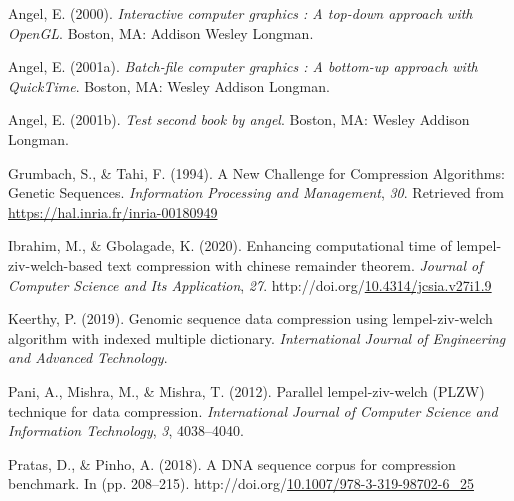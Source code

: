 \documentclass[12pt,twoside]{reedthesis}
\newlength{\cslhangindent}
\newenvironment{CSLReferences}[2] %
 {%
  \setlength{\parindent}{0pt}
  \ifodd #1 \everypar{\setlength{\hangindent}{\cslhangindent}}\ignorespaces\fi
  \ifnum #2 > 0
  \setlength{\parskip}{#2\baselineskip}
  \fi
 }%
 {}
\begin{document}
\begin{CSLReferences}{1}{0}
\leavevmode{}%
Angel, E. (2000). \emph{Interactive computer graphics : A top-down approach with OpenGL}. Boston, MA: Addison Wesley Longman.

\leavevmode{}%
Angel, E. (2001a). \emph{Batch-file computer graphics : A bottom-up approach with QuickTime}. Boston, MA: Wesley Addison Longman.

\leavevmode{}%
Angel, E. (2001b). \emph{Test second book by angel}. Boston, MA: Wesley Addison Longman.

\leavevmode{}%
Grumbach, S., \& Tahi, F. (1994). {A New Challenge for Compression Algorithms: Genetic Sequences}. \emph{{Information Processing and Management}}, \emph{30}. Retrieved from \url{https://hal.inria.fr/inria-00180949}

\leavevmode{}%
Ibrahim, M., \& Gbolagade, K. (2020). Enhancing computational time of lempel-ziv-welch-based text compression with chinese remainder theorem. \emph{Journal of Computer Science and Its Application}, \emph{27}. http://doi.org/\href{https://doi.org/10.4314/jcsia.v27i1.9}{10.4314/jcsia.v27i1.9}

\leavevmode{}%
Keerthy, P. (2019). Genomic sequence data compression using lempel-ziv-welch algorithm with indexed multiple dictionary. \emph{International Journal of Engineering and Advanced Technology}.

\leavevmode{}%
Pani, A., Mishra, M., \& Mishra, T. (2012). Parallel lempel-ziv-welch (PLZW) technique for data compression. \emph{International Journal of Computer Science and Information Technology}, \emph{3}, 4038--4040.

\leavevmode{}%
Pratas, D., \& Pinho, A. (2018). A DNA sequence corpus for compression benchmark. In (pp. 208--215). http://doi.org/\href{https://doi.org/10.1007/978-3-319-98702-6_25}{10.1007/978-3-319-98702-6\_25}

\end{CSLReferences}

\end{document}
